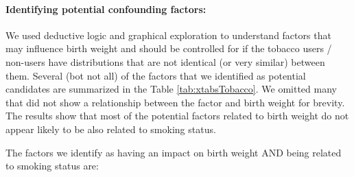 \documentclass[a4paper, 12pt]{article}
\begin{document}
\paragraph{Identifying potential confounding factors:}
We used deductive logic and graphical exploration to understand factors that may influence birth weight and should be controlled for if the tobacco users / non-users have distributions that are not identical (or very similar) between them.  Several (bot not all) of the factors that we identified as potential candidates are summarized in the Table \ref{tab:xtabsTobacco}.  We omitted many that did not show a relationship between the factor and birth weight for brevity.  The results show that most of the potential factors related to birth weight do not appear likely to be also related to smoking status.  \newline


The factors we identify as having an impact on birth weight AND being related to smoking status are:
\end{document}
